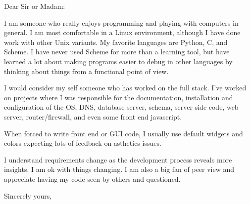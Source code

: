 \documentclass{letter}
\begin{document}
\begin{letter}{}
\opening{Dear Sir or Madam:}
I am someone who really enjoys programming and playing with computers in
general.  I am most comfortable in a Linux environment, although I have
done work with other Unix variants.  My favorite languages are Python,
C, and Scheme.  I have never used Scheme for more than a learning tool,
but have learned a lot about making programs easier to debug in other
languages by thinking about things from a functional point of view.

I would consider my self someone who has worked on the full stack.
I've worked on projects where I was responsible for the documentation,
installation and
configuration of the OS, DNS, database server, schema, server side code,
web server, router/firewall, and even some front end javascript.

When forced to write front end or GUI code, I usually use default widgets
and colors expecting lots of feedback on asthetics issues.

I understand requirements change as the development process reveals
more insights.  I am ok with things changing.  I am also a big fan of
peer view and appreciate having my code seen by others and questioned.

\closing{Sincerely yours,}
\end{letter}
\end{document}
